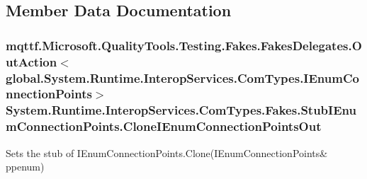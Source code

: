 \subsection{Member Data Documentation}
\hypertarget{class_system_1_1_runtime_1_1_interop_services_1_1_com_types_1_1_fakes_1_1_stub_i_enum_connection_points_a980f5339c0fd7e6cc180a8e6a210a3cf}{
\subsubsection[{Clone\-I\-Enum\-Connection\-Points\-Out}]{\setlength{\rightskip}{0pt plus 5cm}mqttf.\-Microsoft.\-Quality\-Tools.\-Testing.\-Fakes.\-Fakes\-Delegates.\-Out\-Action$<$global.\-System.\-Runtime.\-Interop\-Services.\-Com\-Types.\-I\-Enum\-Connection\-Points$>$ System.\-Runtime.\-Interop\-Services.\-Com\-Types.\-Fakes.\-Stub\-I\-Enum\-Connection\-Points.\-Clone\-I\-Enum\-Connection\-Points\-Out}}\label{class_system_1_1_runtime_1_1_interop_services_1_1_com_types_1_1_fakes_1_1_stub_i_enum_connection_points_a980f5339c0fd7e6cc180a8e6a210a3cf}


Sets the stub of I\-Enum\-Connection\-Points.\-Clone(I\-Enum\-Connection\-Points\& ppenum)

